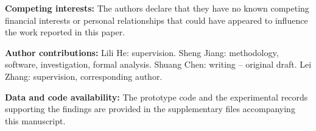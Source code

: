 \documentclass[pdflatex,iicol,sn-mathphys-num]{sn-jnl}
\begin{document}
\noindent\textbf{Competing interests:} The authors declare that they have no known competing financial interests or personal relationships that could have appeared to influence the work reported in this paper.

\noindent\textbf{Author contributions:} Lili He: supervision. Sheng Jiang: methodology, software, investigation, formal analysis. Shuang Chen: writing -- original draft. Lei Zhang: supervision, corresponding author.

\noindent\textbf{Data and code availability:} The prototype code and the experimental records supporting the findings are provided in the supplementary files accompanying this manuscript.
\end{document}
